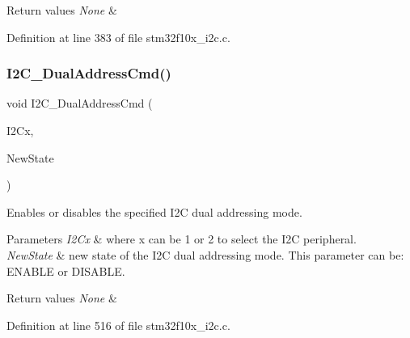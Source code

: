 \begin{DoxyRetVals}{Return values}
{\em None} & \\
\hline
\end{DoxyRetVals}


Definition at line 383 of file stm32f10x\+\_\+i2c.\+c.

\mbox{\label{group___i2_c___private___functions_ga02145a333a56e79557d6ef4ea03fc313}} 
\subsubsection{\texorpdfstring{I2\+C\+\_\+\+Dual\+Address\+Cmd()}{I2C\_DualAddressCmd()}}
{\footnotesize\ttfamily void I2\+C\+\_\+\+Dual\+Address\+Cmd (\begin{DoxyParamCaption}\item[{\hyperlink{struct_i2_c___type_def}{I2\+C\+\_\+\+Type\+Def} $\ast$}]{I2\+Cx,  }\item[{\hyperlink{group___exported__types_gac9a7e9a35d2513ec15c3b537aaa4fba1}{Functional\+State}}]{New\+State }\end{DoxyParamCaption})}



Enables or disables the specified I2C dual addressing mode. 


\begin{DoxyParams}{Parameters}
{\em I2\+Cx} & where x can be 1 or 2 to select the I2C peripheral. \\
\hline
{\em New\+State} & new state of the I2C dual addressing mode. This parameter can be\+: E\+N\+A\+B\+LE or D\+I\+S\+A\+B\+LE. \\
\hline
\end{DoxyParams}

\begin{DoxyRetVals}{Return values}
{\em None} & \\
\hline
\end{DoxyRetVals}


Definition at line 516 of file stm32f10x\+\_\+i2c.\+c.

\mbox{\label{group___i2_c___private___functions_gaa570f76bc34e5b0531b29b1a90af1275}} 
